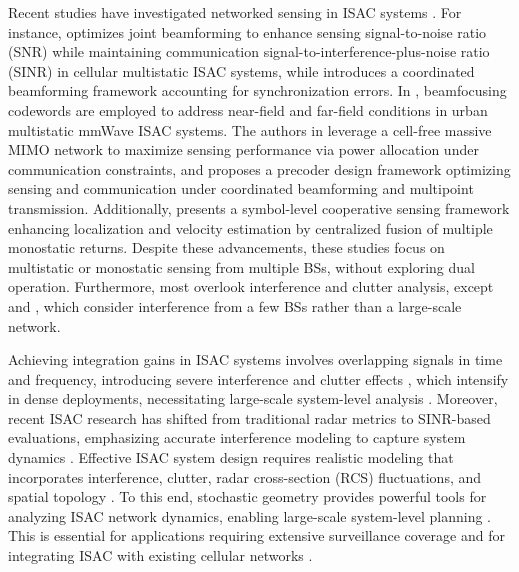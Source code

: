 \documentclass[journal]{IEEEtran}
\begin{document}
Recent studies have investigated networked sensing in ISAC systems \cite{li2023towards,yang2024coordinated,dehkordi2024multistatic,behdad2024multi,babu2024precoding,wei2023symbol}. For instance, \cite{li2023towards} optimizes joint beamforming to enhance sensing signal-to-noise ratio (SNR) while maintaining communication signal-to-interference-plus-noise ratio  (SINR) in cellular multistatic ISAC systems, while \cite{yang2024coordinated} introduces a coordinated beamforming framework accounting for synchronization errors. In \cite{dehkordi2024multistatic}, beamfocusing codewords are employed to address near-field and far-field conditions in urban multistatic mmWave ISAC systems. The authors in \cite{behdad2024multi} leverage a cell-free massive MIMO network to maximize sensing performance via power allocation under communication constraints, and \cite{babu2024precoding} proposes a precoder design framework optimizing sensing and communication under coordinated beamforming and multipoint transmission. Additionally, \cite{wei2023symbol} presents a symbol-level cooperative sensing framework enhancing localization and velocity estimation by centralized fusion of multiple monostatic returns.
Despite these advancements,  these studies focus on multistatic or monostatic sensing from multiple BSs, without exploring dual operation. Furthermore, most overlook interference and clutter analysis, except \cite{behdad2024multi} and \cite{babu2024precoding}, which consider interference from a few BSs rather than a large-scale network.




Achieving integration gains in ISAC systems involves overlapping signals in time and frequency, introducing severe interference and clutter effects \cite{liu2022integrated,zhang2021enabling,wei2023integrated}, which intensify in dense deployments, necessitating large-scale system-level analysis \cite{olson2023coverage}. Moreover, recent ISAC research has shifted from traditional radar metrics to SINR-based evaluations, emphasizing accurate interference modeling to capture system dynamics \cite{olson2023coverage,meng2024network}. Effective ISAC system design requires realistic modeling that incorporates interference, clutter, radar cross-section (RCS) fluctuations, and spatial topology \cite{liu2022integrated,zhang2021enabling,cui2024integrated,lu2024integrated}. 
To this end, stochastic geometry provides powerful tools for analyzing ISAC network dynamics, enabling large-scale system-level planning \cite{meng2024network,olson2023coverage,xu2024performance,sun2024performance,salem2024rethinking,ali2025integrated,10769538}. This is essential for applications requiring extensive surveillance coverage and for integrating ISAC with existing cellular networks \cite{liu2022integrated,zhang2021enabling,cui2024integrated,lu2024integrated}. 
\end{document}
